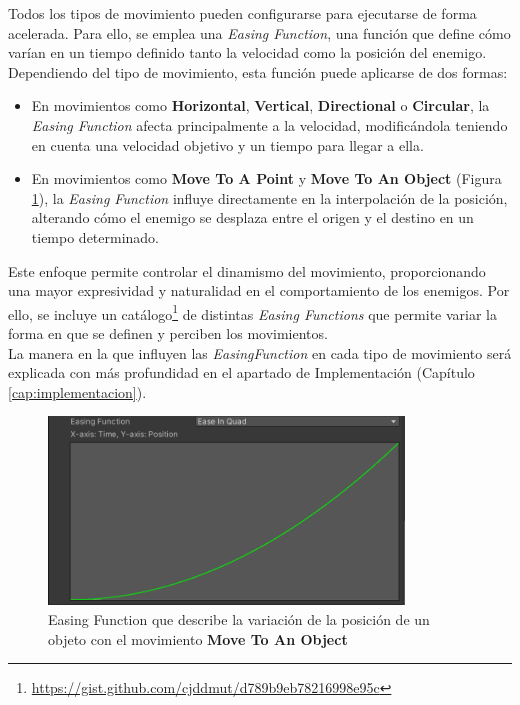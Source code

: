 Todos los tipos de movimiento pueden configurarse para ejecutarse de forma acelerada. Para ello, se emplea una \textit{Easing Function}, una función que define cómo varían en un tiempo definido tanto la velocidad como la posición del enemigo. \\
Dependiendo del tipo de movimiento, esta función puede aplicarse de dos formas:\\

\begin{itemize}
\item En movimientos como \textbf{Horizontal}, \textbf{Vertical}, \textbf{Directional} o \textbf{Circular}, la \textit{Easing Function} afecta principalmente a la velocidad, modificándola teniendo en cuenta una velocidad objetivo y un tiempo para llegar a ella.
\item En movimientos como \textbf{Move To A Point} y \textbf{Move To An Object} (Figura \ref{fig:EasingFunction}), la \textit{Easing Function} influye directamente en la interpolación de la posición, alterando cómo el enemigo se desplaza entre el origen y el destino en un tiempo determinado.
\end{itemize}

Este enfoque permite controlar el dinamismo del movimiento, proporcionando una mayor expresividad y naturalidad en el comportamiento de los enemigos. Por ello, se incluye un catálogo\footnote{\url{https://gist.github.com/cjddmut/d789b9eb78216998e95c}} de distintas \textit{Easing Functions} que permite variar la forma en que se definen y perciben los movimientos.\\

La manera en la que influyen las \textit{EasingFunction} en cada tipo de movimiento será explicada con más profundidad en el apartado de Implementación (Capítulo \ref{cap:implementacion}).

\begin{figure}[t]
	\centering
	\includegraphics[height=5cm]{Imagenes/EasingFunction.png}
	\caption{Easing Function que describe la variación de la posición de un objeto con el movimiento \textbf{Move To An Object}}
	\label{fig:EasingFunction}
\end{figure}

